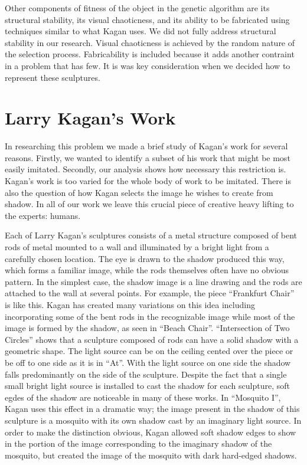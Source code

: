 \documentclass[letter,10pt]{article}
\begin{document}
Other components of fitness of the object in the genetic algorithm
are its structural stability, its visual chaoticness, and its ability
to be fabricated using techniques similar to what Kagan uses. We did
not fully address structural stability in our research. Visual
chaoticness is achieved by the random nature of the selection process.
Fabricability is included because it adds another contraint in a
problem that has few. It is was key consideration when we decided
how to represent these sculptures.

\section{Larry Kagan's Work} \label{kagan}
In researching this problem we made a brief study of Kagan's work for
several reasons. Firstly, we wanted to identify a subset of his work
that might be most easily imitated. Secondly, our analysis shows how
necessary this restriction is. Kagan's work is too varied for the
whole body of work to be imitated. There is also the question of how
Kagan selects the image he wishes to create from shadow. In all of our
work we leave this crucial piece of creative heavy lifting to the
experts: humans.

Each of Larry Kagan's sculptures consists of a metal structure
composed of bent rods of metal mounted to a wall and illuminated by
a bright light from a carefully chosen location. The eye is drawn to
the shadow produced this way, which forms a familiar image, while the
rods themselves often have no obvious pattern. In the simplest case,
the shadow image is a line drawing and the rods are attached to the
wall at several points. For example, the piece ``Frankfurt Chair'' is
like this. Kagan has created many variations on this idea including
incorporating some of the bent rods in the recognizable image while
most of the image is formed by the shadow, as seen in ``Beach Chair''.
``Intersection of Two Circles'' shows that a sculpture composed of rods
can have a solid shadow with a geometric shape. The light source can
be on the ceiling cented over the piece or be off to one side as it
is in ``At''. With the light source on one side the shadow falls
predominantly on the side of the sculpture. Despite the fact that a
single small bright light source is installed to cast the shadow for
each sculpture, soft egdes of the shadow are noticeable in many of
these works. In ``Mosquito I'', Kagan uses this effect in a dramatic
way; the image present in the shadow of this sculpture is a mosquito
with its own shadow cast by an imaginary light source. In order to
make the distinction obvious, Kagan allowed soft shadow edges to show
in the portion of the image corresponding to the imaginary shadow of
the mosquito, but created the image of the mosquito with dark
hard-edged shadows.
\end{document}
